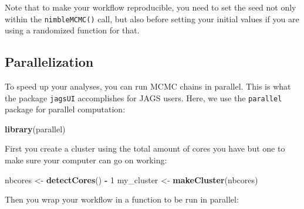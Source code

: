 \documentclass[
  12pt,
]{krantz}
\newenvironment{Shaded}{\begin{snugshade}}{\end{snugshade}}
\newcommand{\DecValTok}[1]{\textcolor[rgb]{0.00,0.00,0.81}{#1}}
\newcommand{\FunctionTok}[1]{\textcolor[rgb]{0.13,0.29,0.53}{\textbf{#1}}}
\newcommand{\NormalTok}[1]{#1}
\newcommand{\OtherTok}[1]{\textcolor[rgb]{0.56,0.35,0.01}{#1}}
\newcommand{\SpecialCharTok}[1]{\textcolor[rgb]{0.81,0.36,0.00}{\textbf{#1}}}
\begin{document}
Note that to make your workflow reproducible, you need to set the seed not only within the \texttt{nimbleMCMC()} call, but also before setting your initial values if you are using a randomized function for that.

\subsection{Parallelization}\label{parallelization}

To speed up your analyses, you can run MCMC chains in parallel. This is what the package \texttt{jagsUI} accomplishes for JAGS users. Here, we use the \texttt{parallel} package for parallel computation:

\begin{Shaded}
\begin{Highlighting}[]
\FunctionTok{library}\NormalTok{(parallel)}
\end{Highlighting}
\end{Shaded}

First you create a cluster using the total amount of cores you have but one to make sure your computer can go on working:

\begin{Shaded}
\begin{Highlighting}[]
\NormalTok{nbcores }\OtherTok{\textless{}{-}} \FunctionTok{detectCores}\NormalTok{() }\SpecialCharTok{{-}} \DecValTok{1}
\NormalTok{my\_cluster }\OtherTok{\textless{}{-}} \FunctionTok{makeCluster}\NormalTok{(nbcores)}
\end{Highlighting}
\end{Shaded}

Then you wrap your workflow in a function to be run in parallel:
\end{document}
